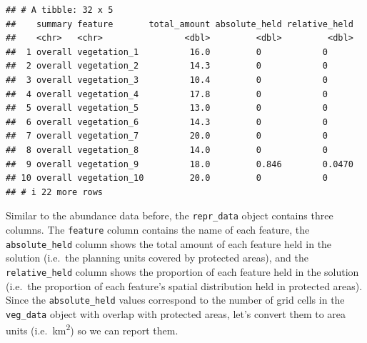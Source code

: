 \documentclass[
  12pt,
]{book}
\newenvironment{Shaded}{\begin{snugshade}}{\end{snugshade}}
\newcommand{\CommentTok}[1]{\textcolor[rgb]{0.56,0.35,0.01}{\textit{#1}}}
\newcommand{\DecValTok}[1]{\textcolor[rgb]{0.00,0.00,0.81}{#1}}
\newcommand{\FunctionTok}[1]{\textcolor[rgb]{0.00,0.00,0.00}{#1}}
\newcommand{\NormalTok}[1]{#1}
\newcommand{\OtherTok}[1]{\textcolor[rgb]{0.56,0.35,0.01}{#1}}
\newcommand{\SpecialCharTok}[1]{\textcolor[rgb]{0.00,0.00,0.00}{#1}}
\begin{document}
\begin{verbatim}
## # A tibble: 32 x 5
##    summary feature       total_amount absolute_held relative_held
##    <chr>   <chr>                <dbl>         <dbl>         <dbl>
##  1 overall vegetation_1          16.0         0            0     
##  2 overall vegetation_2          14.3         0            0     
##  3 overall vegetation_3          10.4         0            0     
##  4 overall vegetation_4          17.8         0            0     
##  5 overall vegetation_5          13.0         0            0     
##  6 overall vegetation_6          14.3         0            0     
##  7 overall vegetation_7          20.0         0            0     
##  8 overall vegetation_8          14.0         0            0     
##  9 overall vegetation_9          18.0         0.846        0.0470
## 10 overall vegetation_10         20.0         0            0     
## # i 22 more rows
\end{verbatim}

Similar to the abundance data before, the \texttt{repr\_data} object contains three columns. The \texttt{feature} column contains the name of each feature, the \texttt{absolute\_held} column shows the total amount of each feature held in the solution (i.e.~the planning units covered by protected areas), and the \texttt{relative\_held} column shows the proportion of each feature held in the solution (i.e.~the proportion of each feature's spatial distribution held in protected areas). Since the \texttt{absolute\_held} values correspond to the number of grid cells in the \texttt{veg\_data} object with overlap with protected areas, let's convert them to area units (i.e.~km\textsuperscript{2}) so we can report them.

\begin{Shaded}
\end{Shaded}
\end{document}
